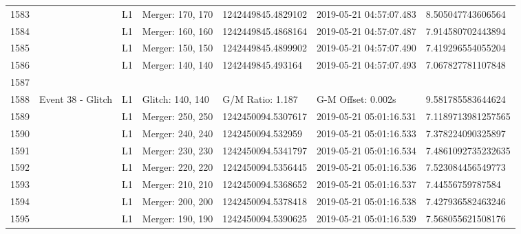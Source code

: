 \begin{longtable}{lllllll}
1583 &                                                    &       L1 &  Merger: 170, 170 &  1242449845.4829102 &  2019-05-21 04:57:07.483 &   8.505047743606564 \\
1584 &                                                    &       L1 &  Merger: 160, 160 &  1242449845.4868164 &  2019-05-21 04:57:07.487 &   7.914580702443894 \\
1585 &                                                    &       L1 &  Merger: 150, 150 &  1242449845.4899902 &  2019-05-21 04:57:07.490 &   7.419296554055204 \\
1586 &                                                    &       L1 &  Merger: 140, 140 &   1242449845.493164 &  2019-05-21 04:57:07.493 &   7.067827781107848 \\
1587 &                                                    &          &                   &                     &                          &                     \\
1588 &                                  Event 38 - Glitch &       L1 &  Glitch: 140, 140 &    G/M Ratio: 1.187 &       G-M Offset: 0.002s &   9.581785583644624 \\
1589 &                                                    &       L1 &  Merger: 250, 250 &  1242450094.5307617 &  2019-05-21 05:01:16.531 &  7.1189713981257565 \\
1590 &                                                    &       L1 &  Merger: 240, 240 &   1242450094.532959 &  2019-05-21 05:01:16.533 &   7.378224090325897 \\
1591 &                                                    &       L1 &  Merger: 230, 230 &  1242450094.5341797 &  2019-05-21 05:01:16.534 &  7.4861092735232635 \\
1592 &                                                    &       L1 &  Merger: 220, 220 &  1242450094.5356445 &  2019-05-21 05:01:16.536 &   7.523084456549773 \\
1593 &                                                    &       L1 &  Merger: 210, 210 &  1242450094.5368652 &  2019-05-21 05:01:16.537 &    7.44556759787584 \\
1594 &                                                    &       L1 &  Merger: 200, 200 &  1242450094.5378418 &  2019-05-21 05:01:16.538 &   7.427936582463246 \\
1595 &                                                    &       L1 &  Merger: 190, 190 &  1242450094.5390625 &  2019-05-21 05:01:16.539 &   7.568055621508176 \\

\end{longtable}
